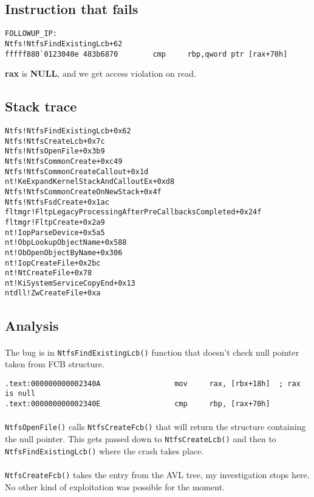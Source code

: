 \documentclass[12pt]{article}
\begin{document}
\subsection{Instruction that fails}
\begin{verbatim}
FOLLOWUP_IP: 
Ntfs!NtfsFindExistingLcb+62
fffff880`0123040e 483b6870        cmp     rbp,qword ptr [rax+70h]
\end{verbatim}
\textbf{rax} is \textbf{NULL}, and we get access violation on read. 

\subsection{Stack trace}
\begin{verbatim}
Ntfs!NtfsFindExistingLcb+0x62
Ntfs!NtfsCreateLcb+0x7c
Ntfs!NtfsOpenFile+0x3b9
Ntfs!NtfsCommonCreate+0xc49
Ntfs!NtfsCommonCreateCallout+0x1d
nt!KeExpandKernelStackAndCalloutEx+0xd8
Ntfs!NtfsCommonCreateOnNewStack+0x4f
Ntfs!NtfsFsdCreate+0x1ac
fltmgr!FltpLegacyProcessingAfterPreCallbacksCompleted+0x24f
fltmgr!FltpCreate+0x2a9
nt!IopParseDevice+0x5a5
nt!ObpLookupObjectName+0x588
nt!ObOpenObjectByName+0x306
nt!IopCreateFile+0x2bc
nt!NtCreateFile+0x78
nt!KiSystemServiceCopyEnd+0x13
ntdll!ZwCreateFile+0xa

\end{verbatim}
\subsection{Analysis}
\paragraph*{} The bug is in \texttt{NtfsFindExistingLcb()} function that doesn't check null pointer taken from FCB structure.
\begin{verbatim}
.text:000000000002340A                 mov     rax, [rbx+18h]  ; rax is null
.text:000000000002340E                 cmp     rbp, [rax+70h]
\end{verbatim}

\paragraph*{} \texttt{NtfsOpenFile()} calls \texttt{NtfsCreateFcb()} that will return the structure containing the null pointer. This gets passed down to \texttt{NtfsCreateLcb()} and then to \texttt{NtfsFindExistingLcb()} where the crash takes place.
\paragraph*{} \texttt{NtfsCreateFcb()} takes the entry from the AVL tree, my investigation stops here.
No other kind of exploitation was possible for the moment.
\end{document}
